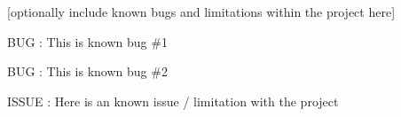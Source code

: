 
\begin{DoxyRefList}
\item[\label{bug__bug000001}%
\hypertarget{bug__bug000001}{}%
page \hyperlink{index}{S\-O\-C\-C\-E\-R T\-E\-A\-M T\-R\-A\-C\-K\-E\-R v1.0} ]\mbox{[}optionally include known bugs and limitations within the project here\mbox{]}
\begin{DoxyItemize}
\item B\-U\-G \-: This is known bug \#1
\item B\-U\-G \-: This is known bug \#2
\item I\-S\-S\-U\-E \-: Here is an known issue / limitation with the project
\end{DoxyItemize}
\end{DoxyRefList}